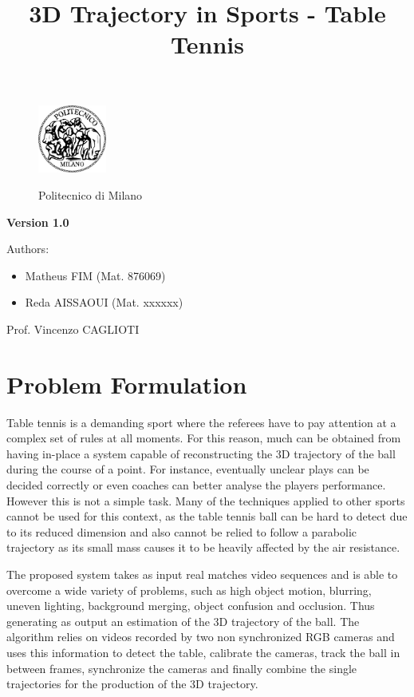 \documentclass[a4paper]{article}
\title{3D Trajectory in Sports - Table Tennis}
\begin{document}
\begin{titlepage}
\begin{figure}
\centering
\includegraphics[width=0.2\textwidth]{polimi.jpg}
\par
\LARGE Politecnico di Milano
\end{figure}


\maketitle
\textbf{Version 1.0}
\newline

\raggedright
Authors:
\begin{itemize}
	\item Matheus FIM (Mat. 876069)
    \item Reda AISSAOUI (Mat. xxxxxx)

\end{itemize}
\raggedleft
Prof. Vincenzo CAGLIOTI
\thispagestyle{empty}
\end{titlepage}


\tableofcontents
\newpage
 
\section{Problem Formulation}

Table tennis is a demanding sport where the referees have to pay attention at a complex set of rules at all moments. For this reason, much can be obtained from having in-place a system capable of reconstructing the 3D trajectory of the ball during the course of a point. For instance, eventually unclear plays can be decided correctly or even coaches can better analyse the players performance. However this is not a simple task. Many of the techniques applied to other sports cannot be used for this context, as the table tennis ball can be hard to detect due to its reduced dimension and also cannot be relied to follow a parabolic trajectory as its small mass causes it to be heavily affected by the air resistance.

The proposed system takes as input real matches video sequences and is able to overcome a wide variety of problems, such as high object motion, blurring, uneven lighting, background merging, object confusion and occlusion. Thus generating as output an estimation of the 3D trajectory of the ball. The algorithm relies on videos recorded by two non synchronized RGB  cameras and uses this information to detect the table, calibrate the cameras, track the ball in between frames, synchronize the cameras and finally combine the single trajectories for the production of the 3D trajectory.
\end{document}
